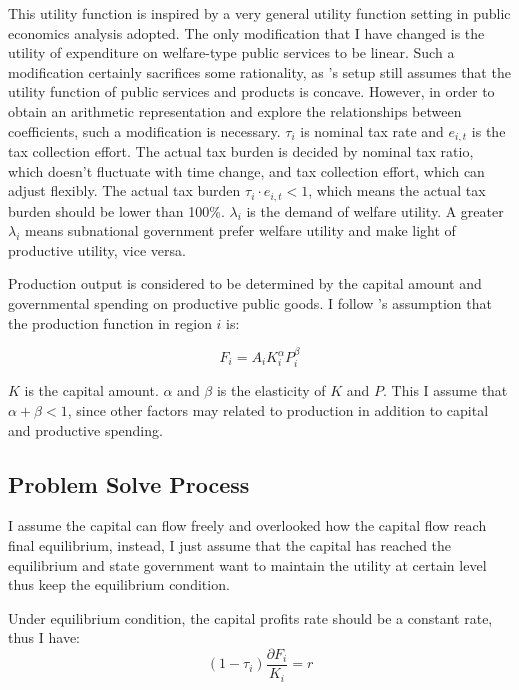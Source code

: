 This utility function is inspired by a very general utility function setting in public economics analysis \parencite{cai2005does,persson2002political,edwards1996tax} adopted. The only modification that I have changed is the utility of expenditure on welfare-type public services to be linear. Such a modification certainly sacrifices some rationality, as \textcite{cai2005does}'s setup still assumes that the utility function of public services and products is concave. However, in order to obtain an arithmetic representation and explore the relationships between coefficients, such a modification is necessary. $\tau_i$\label{taxrateee} is nominal tax rate and $e_{i,t}$ is the tax collection effort. The actual tax burden is decided by nominal tax ratio, which doesn't fluctuate with time change, and tax collection effort, which can adjust flexibly. The actual tax burden $\tau_i\cdot e_{i,t}<1$, which means the actual tax burden should be lower than 100\%. $\lambda_i$ is the demand of welfare utility\label{demanddd}. A greater $\lambda_i$ means subnational government prefer welfare utility and make light of productive utility, vice versa.


Production output is considered to be determined by the capital amount and governmental spending on productive public goods\parencite{cai2005does}. I follow \textcite{lv2008taxeffort}'s assumption that the production function in region $i$ is:

\begin{equation}
    F_i=A_iK_i^{\alpha}P_i^{\beta} \label{F}
\end{equation}

$K$ is the capital amount. $\alpha$ and $\beta$ is the elasticity of $K$ and $P$. This  I assume that $\alpha+\beta<1$, since other factors may related to production in addition to capital and productive spending.


\subsection{Problem Solve Process}
I assume the capital can flow freely and overlooked how the capital flow reach final equilibrium, instead, I just assume that the capital has reached the equilibrium and state government want to maintain the utility at certain level thus keep the equilibrium condition.

Under equilibrium condition, the capital profits rate should be a constant rate, thus I have:
\begin{equation}
    (1-\tau_i)\frac{\partial F_i}{K_i}=r\label{R}
\end{equation}

